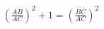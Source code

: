 \documentclass[preview]{standalone}
\begin{document}
\begin{align*}
\left(\frac{AB}{AC}\right)^2 + 1 = \left(\frac{BC}{AC}\right)^2
\end{align*}
\end{document}
